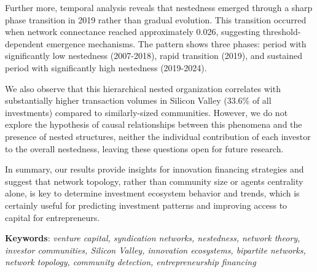 Further more, temporal analysis reveals that nestedness emerged through a sharp phase transition in 2019 rather than gradual evolution. This transition occurred when network connectance reached approximately 0.026, suggesting threshold-dependent emergence mechanisms. The pattern shows three phases: period with significantly low nestedness (2007-2018), rapid transition (2019), and sustained period with significantly high nestedness (2019-2024).

We also observe that this hierarchical nested organization correlates with substantially higher transaction volumes in Silicon Valley (33.6\% of all investments) compared to similarly-sized communities. However, we do not explore the hypothesis of causal relationships between this phenomena and the presence of nested structures, neither the individual contribution of each investor to the overall nestedness, leaving these questions open for future research.

In summary, our results provide insights for innovation financing strategies and suggest that network topology, rather than community size or agents centrality alone, is key to determine investment ecosystem behavior and trends, which is certainly useful for predicting investment patterns and improving access to capital for entrepreneurs.

\vspace{\fill}

\textbf{Keywords}: \textit{venture capital, syndication networks, nestedness, network theory, investor communities, Silicon Valley, innovation ecosystems, bipartite networks, network topology, community detection, entrepreneurship financing}

\pagebreak
